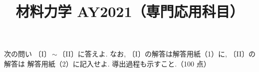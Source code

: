 \documentclass[11pt,a4paper]{article}
\title{材料力学 AY2021（専門応用科目）}
\author{}
\date{}
\begin{document}
\maketitle

\noindent
次の問い 〔I〕\,$\sim$\,〔II〕に答えよ. なお, 〔I〕の解答は解答用紙（1）に, 〔II〕の解答は
解答用紙（2）に記入せよ. 導出過程も示すこと.\hfill（100 点）

\bigskip

\clearpage

\end{document}

